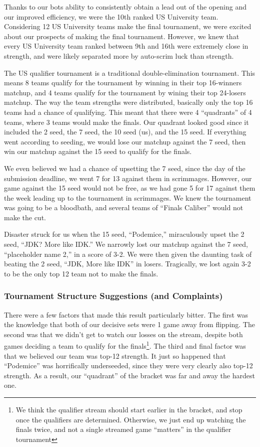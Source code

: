 Thanks to our bots ability to consistently obtain a lead out of the opening and our improved efficiency, we were the 10th ranked US University team. Considering 12 US University teams make the final tournament, we were excited about our prospects of making the final tournament. However, we knew that every US University team ranked between 9th and 16th were extremely close in strength, and were likely separated more by auto-scrim luck than strength.

\medskip

The US qualifier tournament is a traditional double-elimination tournament. This means 8 teams qualify for the tournament by winning in their top 16-winners matchup, and 4 teams qualify for the tournament by wining their top 24-losers matchup. The way the team strengths were distributed, basically only the top 16 teams had a chance of qualifying. This meant that there were 4 ``quadrants'' of 4 teams, where 3 teams would make the finals. Our quadrant looked good since it included the 2 seed, the 7 seed, the 10 seed (us), and the 15 seed. If everything went according to seeding, we would lose our matchup against the 7 seed, then win our matchup against the 15 seed to qualify for the finals.

\medskip

We even believed we had a chance of upsetting the 7 seed, since the day of the submission deadline, we went 7 for 13 against them in scrimmages. However, our game against the 15 seed would not be free, as we had gone 5 for 17 against them the week leading up to the tournament in scrimmages. We knew the tournament was going to be a bloodbath, and several teams of ``Finals Caliber'' would not make the cut.

\medskip

Disaster struck for us when the 15 seed, ``Podemice,'' miraculously upset the 2 seed, ``JDK? More like IDK.'' We narrowly lost our matchup against the 7 seed, ``placeholder name 2,'' in a score of 3-2. We were then given the daunting task of beating the 2 seed, ``JDK, More like IDK'' in losers. Tragically, we lost again 3-2 to be the only top 12 team not to make the finals.

\subsubsection{Tournament Structure Suggestions (and Complaints)}

There were a few factors that made this result particularly bitter. The first was the knowledge that both of our decisive sets were 1 game away from flipping. The second was that we didn't get to watch our losses on the stream, despite both games deciding a team to qualify for the finals\footnote{We think the qualifier stream should start earlier in the bracket, and stop once the qualifiers are determined. Otherwise, we just end up watching the finals twice, and not a single streamed game ``matters'' in the qualifier tournament}. The third and final factor was that we believed our team was top-12 strength. It just so happened that ``Podemice'' was horrifically underseeded, since they were very clearly also top-12 strength. As a result, our ``quadrant'' of the bracket was far and away the hardest one.

